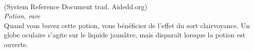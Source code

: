 \\
{\small (System Reference Document trad. Aidedd.org)}\\
{\small \it Potion, rare}\\
Quand vous buvez cette potion, vous bénéficiez de l'effet du sort clairvoyance. Un globe oculaire s'agite sur le liquide jaunâtre, mais disparaît lorsque la potion est ouverte. \\

